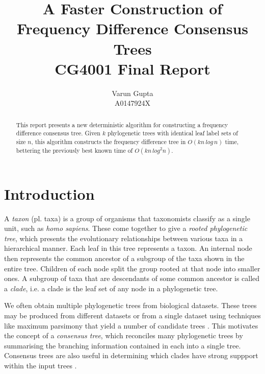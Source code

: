 \documentclass{article}
\title{A Faster Construction of Frequency Difference Consensus Trees\\CG4001 Final Report}
\author{Varun Gupta\\A0147924X}
\begin{document}
    \maketitle

    \begin{abstract}
        This report presents a new deterministic algorithm for constructing a frequency difference consensus tree. Given $k$ phylogenetic trees with identical leaf label sets of size $n$, this algorithm constructs the frequency difference tree in $O(kn\,log\,n)$ time, bettering the previously best known time of $O(kn\,log^2n)$.
    \end{abstract}

    \section{Introduction}
    \label{sec:introduction}

    A \textit{taxon} (pl. taxa) is a group of organisms that taxonomists classify as a single unit, such as \textit{homo sapiens}. These come together to give a \textit{rooted phylogenetic tree}, which presents the evolutionary relationships between various taxa in a hierarchical manner. Each leaf in this tree represents a taxon. An internal node then represents the common ancestor of a subgroup of the taxa shown in the entire tree. Children of each node split the group rooted at that node into smaller ones. A subgroup of taxa that are descendants of some common ancestor is called a \textit{clade}, i.e. a clade is the leaf set of any node in a phylogenetic tree.

    We often obtain multiple phylogenetic trees from biological datasets. These trees may be produced from different datasets or from a single dataset using techniques like maximum parsimony that yield a number of candidate trees \cite{bryant1997hunting}. This motivates the concept of a \textit{consensus tree}, which reconciles many phylogenetic trees by summarising the branching information contained in each into a single tree. Consensus trees are also useful in determining which clades have strong suppport within the input trees \cite{felsenstein2004inferring}.
\end{document}
